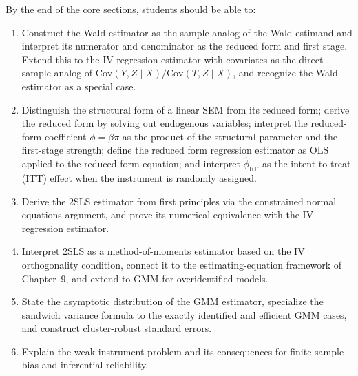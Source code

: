 \documentclass[master.tex]{subfiles}
\begin{document}

\begin{tcolorbox}[defstyle, title={Learning Objectives --- Core Material
  (\S\S\,\ref{w12:sec:wald}--\ref{w12:sec:asymp},
   \ref{w12:sec:weak})}]
By the end of the core sections, students should be able to:
\begin{enumerate}
  \item Construct the Wald estimator as the sample analog of the Wald
    estimand and interpret its numerator and denominator as the
    reduced form and first stage.  Extend this to the IV regression
    estimator with covariates as the direct sample analog of
    $\mathrm{Cov}(Y,Z\mid X)/\mathrm{Cov}(T,Z\mid X)$, and recognize
    the Wald estimator as a special case.
  \item Distinguish the structural form of a linear SEM from its
    reduced form; derive the reduced form by solving out endogenous
    variables; interpret the reduced-form coefficient $\phi = \beta\pi$
    as the product of the structural parameter and the first-stage
    strength; define the reduced form regression estimator as OLS
    applied to the reduced form equation; and interpret
    $\hat\phi_{\mathrm{RF}}$ as the intent-to-treat (ITT) effect when
    the instrument is randomly assigned.
  \item Derive the 2SLS estimator from first principles via the
    constrained normal equations argument, and prove its numerical
    equivalence with the IV regression estimator.
  \item Interpret 2SLS as a method-of-moments estimator based on the
    IV orthogonality condition, connect it to the estimating-equation
    framework of Chapter~9, and extend to GMM for overidentified
    models.
  \item State the asymptotic distribution of the GMM estimator,
    specialize the sandwich variance formula to the exactly identified
    and efficient GMM cases, and construct cluster-robust standard
    errors.
  \item Explain the weak-instrument problem and its consequences for
    finite-sample bias and inferential reliability.
\end{enumerate}
\end{tcolorbox}
\end{document}
